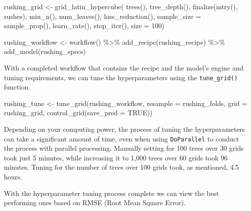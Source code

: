 \documentclass[
  letterpaper,
]{krantz}
\newenvironment{Shaded}{\begin{snugshade}}{\end{snugshade}}
\newcommand{\AttributeTok}[1]{\textcolor[rgb]{0.40,0.45,0.13}{#1}}
\newcommand{\ConstantTok}[1]{\textcolor[rgb]{0.56,0.35,0.01}{#1}}
\newcommand{\DecValTok}[1]{\textcolor[rgb]{0.68,0.00,0.00}{#1}}
\newcommand{\FunctionTok}[1]{\textcolor[rgb]{0.28,0.35,0.67}{#1}}
\newcommand{\NormalTok}[1]{\textcolor[rgb]{0.00,0.23,0.31}{#1}}
\newcommand{\OtherTok}[1]{\textcolor[rgb]{0.00,0.23,0.31}{#1}}
\newcommand{\SpecialCharTok}[1]{\textcolor[rgb]{0.37,0.37,0.37}{#1}}
\begin{document}
\begin{Shaded}
\begin{Highlighting}[]
\NormalTok{rushing\_grid }\OtherTok{\textless{}{-}} \FunctionTok{grid\_latin\_hypercube}\NormalTok{(}
  \FunctionTok{trees}\NormalTok{(),}
  \FunctionTok{tree\_depth}\NormalTok{(),}
  \FunctionTok{finalize}\NormalTok{(}\FunctionTok{mtry}\NormalTok{(), rushes),}
  \FunctionTok{min\_n}\NormalTok{(),}
  \FunctionTok{num\_leaves}\NormalTok{(),}
  \FunctionTok{loss\_reduction}\NormalTok{(),}
  \AttributeTok{sample\_size =} \FunctionTok{sample\_prop}\NormalTok{(),}
  \FunctionTok{learn\_rate}\NormalTok{(),}
  \FunctionTok{stop\_iter}\NormalTok{(),}
  \AttributeTok{size =} \DecValTok{100}\NormalTok{)}

\NormalTok{rushing\_workflow }\OtherTok{\textless{}{-}}
  \FunctionTok{workflow}\NormalTok{() }\SpecialCharTok{\%\textgreater{}\%}
  \FunctionTok{add\_recipe}\NormalTok{(rushing\_recipe) }\SpecialCharTok{\%\textgreater{}\%}
  \FunctionTok{add\_model}\NormalTok{(rushing\_specs)}
\end{Highlighting}
\end{Shaded}

With a completed workflow that contains the recipe and the model's
engine and tuning requirements, we can tune the hyperparameters using
the \texttt{tune\_grid()} function.

\begin{Shaded}
\begin{Highlighting}[]
\NormalTok{rushing\_tune }\OtherTok{\textless{}{-}} \FunctionTok{tune\_grid}\NormalTok{(rushing\_workflow,}
                          \AttributeTok{resample =}\NormalTok{ rushing\_folds,}
                          \AttributeTok{grid =}\NormalTok{ rushing\_grid,}
                          \FunctionTok{control\_grid}\NormalTok{(}\AttributeTok{save\_pred =} \ConstantTok{TRUE}\NormalTok{))}
\end{Highlighting}
\end{Shaded}

Depending on your computing power, the process of tuning the
hyperparameters can take a significant amount of time, even when using
\texttt{DoParallel} to conduct the process with parallel processing.
Manually setting for 100 trees over 30 grids took just 5 minutes, while
increasing it to 1,000 trees over 60 grids took 96 minutes. Tuning for
the number of trees over 100 grids took, as mentioned, 4.5 hours.

With the hyperparameter tuning process complete we can view the best
performing ones based on RMSE (Root Mean Square Error).
\end{document}
